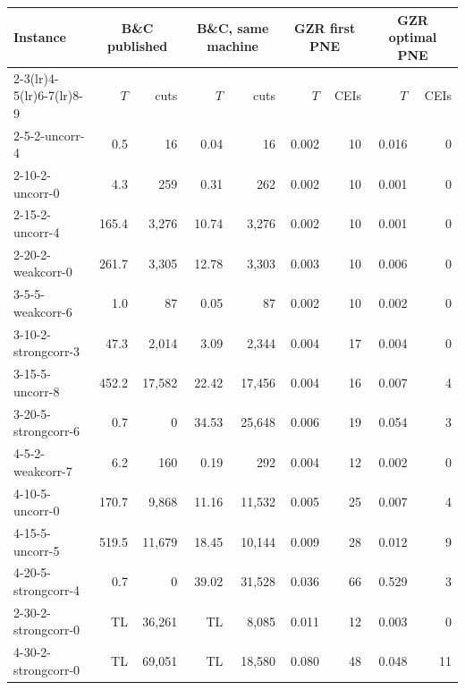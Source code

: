 \begin{tabular}{lrrrrrrrr}
\toprule
Instance & \multicolumn{2}{c}{B\&C published} & \multicolumn{2}{c}{B\&C, same machine} & \multicolumn{2}{c}{GZR first PNE} & \multicolumn{2}{c}{GZR optimal PNE}\\
\cmidrule(lr){2-3}\cmidrule(lr){4-5}\cmidrule(lr){6-7}\cmidrule(lr){8-9}
 & $T$ & cuts & $T$ & cuts & $T$ & CEIs & $T$ & CEIs\\
\midrule
2-5-2-uncorr-4 & 0.5 & 16 & 0.04 & 16 & 0.002 & 10 & 0.016 & 0\\
2-10-2-uncorr-0 & 4.3 & 259 & 0.31 & 262 & 0.002 & 10 & 0.001 & 0\\
2-15-2-uncorr-4 & 165.4 & 3,276 & 10.74 & 3,276 & 0.002 & 10 & 0.001 & 0\\
2-20-2-weakcorr-0 & 261.7 & 3,305 & 12.78 & 3,303 & 0.003 & 10 & 0.006 & 0\\
3-5-5-weakcorr-6 & 1.0 & 87 & 0.05 & 87 & 0.002 & 10 & 0.002 & 0\\
3-10-2-strongcorr-3 & 47.3 & 2,014 & 3.09 & 2,344 & 0.004 & 17 & 0.004 & 0\\
3-15-5-uncorr-8 & 452.2 & 17,582 & 22.42 & 17,456 & 0.004 & 16 & 0.007 & 4\\
3-20-5-strongcorr-6 & 0.7 & 0 & 34.53 & 25,648 & 0.006 & 19 & 0.054 & 3\\
4-5-2-weakcorr-7 & 6.2 & 160 & 0.19 & 292 & 0.004 & 12 & 0.002 & 0\\
4-10-5-uncorr-0 & 170.7 & 9,868 & 11.16 & 11,532 & 0.005 & 25 & 0.007 & 4\\
4-15-5-uncorr-5 & 519.5 & 11,679 & 18.45 & 10,144 & 0.009 & 28 & 0.012 & 9\\
4-20-5-strongcorr-4 & 0.7 & 0 & 39.02 & 31,528 & 0.036 & 66 & 0.529 & 3\\
2-30-2-strongcorr-0 & TL & 36,261 & TL & 8,085 & 0.011 & 12 & 0.003 & 0\\
4-30-2-strongcorr-0 & TL & 69,051 & TL & 18,580 & 0.080 & 48 & 0.048 & 11\\
\bottomrule
\end{tabular}
